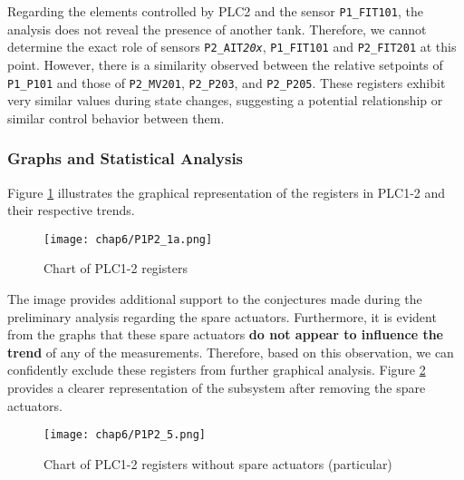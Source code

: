 

\bigskip
Regarding the elements controlled by PLC2 and the sensor \texttt{P1\_FIT101}, the analysis does not reveal the presence of another tank. Therefore, we cannot determine the exact role of sensors \texttt{P2\_AIT\textit{20x}}, \texttt{P1\_FIT101} and \texttt{P2\_FIT201} at this point.\newline
However, there is a similarity observed between the relative setpoints of \texttt{P1\_P101} and those of \texttt{P2\_MV201}, \texttt{P2\_P203}, and \texttt{P2\_P205}. These registers exhibit very similar values during state changes, suggesting a potential relationship or similar control behavior between them.

\vfill

\subsubsection{Graphs and Statistical Analysis}
\label{subsubsec:6_P1P2_graphs}
Figure \ref{fig:6_P1P2_graph_full} illustrates the graphical representation of the registers in PLC1-2 and their respective trends.

\begin{figure}[ht]
	\centering
	\texttt{[image: chap6/P1P2\_1a.png]}
	\caption{Chart of PLC1-2 registers}
	\label{fig:6_P1P2_graph_full}
\end{figure}

The image provides additional support to the conjectures made during the preliminary analysis regarding the spare actuators. Furthermore, it is evident from the graphs that these spare actuators \textbf{do not appear to influence the trend} of any of the measurements. Therefore, based on this observation, we can confidently exclude these registers from further graphical analysis.\newline \newline
Figure \ref{fig:6_P1P2_graph_full_nospare} provides a clearer representation of the subsystem after removing the spare actuators.

\begin{figure}[ht]
	\centering
	\texttt{[image: chap6/P1P2\_5.png]}
	\caption{Chart of PLC1-2 registers without spare actuators (particular)}
	\label{fig:6_P1P2_graph_full_nospare}
\end{figure}

